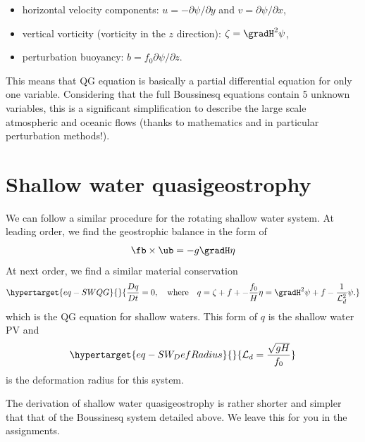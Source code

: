 \documentclass[
  letterpaper,
  twocolumn,
  landscape]{report}
\begin{document}
\begin{itemize}
    \item horizontal velocity components: $u=-{\partial \psi}/{\partial y}$ and $v={\partial \psi}/{\partial x}$,
    \item vertical vorticity (vorticity in the $z$ direction): $\zeta = \gradH^2 \psi$,
    \item perturbation buoyancy: $b = f_0 {\partial \psi}/{\partial z}$.
\end{itemize}

This means that QG equation is basically a partial differential equation
for only one variable. Considering that the full Boussinesq equations
contain 5 unknown variables, this is a significant simplification to
describe the large scale atmospheric and oceanic flows (thanks to
mathematics and in particular perturbation methods!).

\hypertarget{sec-QGSW}{%
\section{Shallow water quasigeostrophy}\label{sec-QGSW}}

We can follow a similar procedure for the rotating shallow water system.
At leading order, we find the geostrophic balance in the form of \[
    \fb \times \ub = - g \gradH \eta
\] At next order, we find a similar material conservation
\begin{equation}\protect\hypertarget{eq-SWQG}{}{
    \frac{D q}{D t}  = 0, \quad \text{where} \quad q = \zeta + f +  -\frac{f_0}{H} \eta = \gradH^2 \psi + f -\frac{1}{\mathcal{L}_d^2} \psi.
}\label{eq-SWQG}\end{equation} which is the QG equation for shallow
waters. This form of \(q\) is the shallow water PV and
\begin{equation}\protect\hypertarget{eq-SW_DefRadius}{}{  \mathcal{L}_d = \frac{\sqrt{g H}}{f_0} }\label{eq-SW_DefRadius}\end{equation}
is the deformation radius for this system.

\begin{tcolorbox}[enhanced jigsaw, toprule=.15mm, left=2mm, opacityback=0, breakable, arc=.35mm, colback=white, rightrule=.15mm, bottomrule=.15mm, colframe=quarto-callout-note-color-frame, leftrule=.75mm]
\begin{minipage}[t]{5.5mm}
\textcolor{quarto-callout-note-color}{\faInfo}
\end{minipage}%
\begin{minipage}[t]{\textwidth - 5.5mm}

The derivation of shallow water quasigeostrophy is rather shorter and
simpler that that of the Boussinesq system detailed above. We leave this
for you in the assignments.

\end{minipage}%
\end{tcolorbox}
\end{document}
